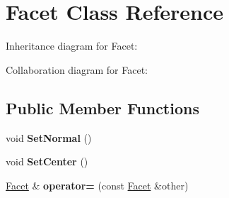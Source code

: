 \hypertarget{class_facet}{}\section{Facet Class Reference}
\label{class_facet}


Inheritance diagram for Facet\+:


Collaboration diagram for Facet\+:
\subsection*{Public Member Functions}
\begin{DoxyCompactItemize}
\item 
\mbox{\label{class_facet_a0d3733ac4cb080adb891d61aa53e99a0}} 
void {\bfseries Set\+Normal} ()
\item 
\mbox{\label{class_facet_a6d79392e22bf04c6569b9a1933f5ca3d}} 
void {\bfseries Set\+Center} ()
\item 
\mbox{\label{class_facet_a212a6d0725dcc1102901f4b46153ede2}} 
\mbox{\hyperlink{class_facet}{Facet}} \& {\bfseries operator=} (const \mbox{\hyperlink{class_facet}{Facet}} \&other)
\end{DoxyCompactItemize}
